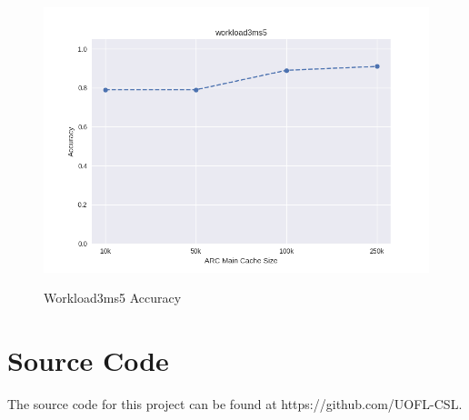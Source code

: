\documentclass[MEng]{uofl}
\begin{document}
\begin{figure}
    \caption{Workload3ms5 Accuracy}
    \includegraphics[width=\columnwidth]{workload3ms5.png}
    \label{w3ms5}
\end{figure}

\chapter{Source Code}

The source code for this project can be found at https://github.com/UOFL-CSL.



\nocite{vStream}
\nocite{streampc}
\nocite{ladaptivereplace}

\end{document}
